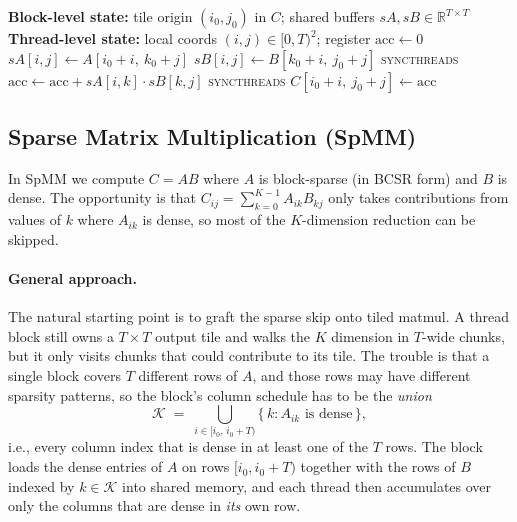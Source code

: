 \documentclass[11pt]{article}
\begin{document}
\begin{algorithm}[H]
\caption{Tiled matrix multiplication for $C = A \cdot B$. One thread block per $T \times T$ output tile, one thread per output entry.}
\begin{algorithmic}[1]
\Statex \textbf{Block-level state:} tile origin $(i_0, j_0)$ in $C$; shared buffers $sA, sB \in \mathbb{R}^{T \times T}$
\Statex \textbf{Thread-level state:} local coords $(i, j) \in [0, T)^2$; register $\mathrm{acc} \gets 0$
    \State $sA[i, j] \gets A[i_0 + i,\ k_0 + j]$
    \State $sB[i, j] \gets B[k_0 + i,\ j_0 + j]$
    \State \textsc{syncthreads}
        \State $\mathrm{acc} \gets \mathrm{acc} + sA[i, k] \cdot sB[k, j]$
    \EndFor
    \State \textsc{syncthreads}
\EndFor
\State $C[i_0 + i,\ j_0 + j] \gets \mathrm{acc}$
\end{algorithmic}
\end{algorithm}

\subsection*{Sparse Matrix Multiplication (SpMM)}
In SpMM we compute $C = AB$ where $A$ is block-sparse (in BCSR form) and $B$ is dense. The opportunity is that $C_{ij} = \sum_{k=0}^{K-1} A_{ik} B_{kj}$ only takes contributions from values of $k$ where $A_{ik}$ is dense, so most of the $K$-dimension reduction can be skipped.

\paragraph{General approach.}
The natural starting point is to graft the sparse skip onto tiled matmul. A thread block still owns a $T \times T$ output tile and walks the $K$ dimension in $T$-wide chunks, but it only visits chunks that could contribute to its tile. The trouble is that a single block covers $T$ different rows of $A$, and those rows may have different sparsity patterns, so the block's column schedule has to be the \emph{union}
\[
\mathcal{K} \;=\; \bigcup_{i \in [i_0,\, i_0 + T)} \{\, k : A_{ik} \text{ is dense}\,\},
\]
i.e., every column index that is dense in at least one of the $T$ rows. The block loads the dense entries of $A$ on rows $[i_0, i_0+T)$ together with the rows of $B$ indexed by $k \in \mathcal{K}$ into shared memory, and each thread then accumulates over only the columns that are dense in \emph{its} own row.
\end{document}
